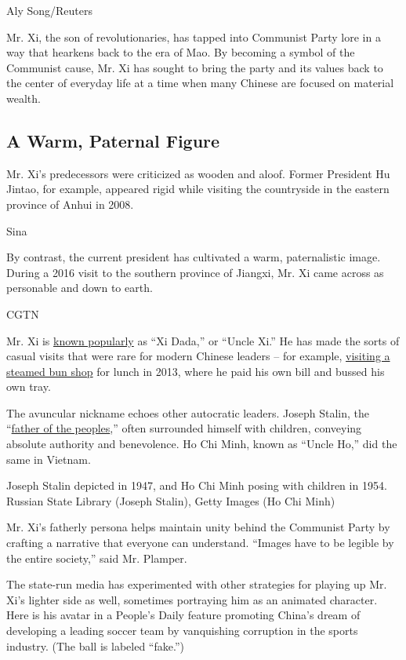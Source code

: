 Aly Song/Reuters

Mr. Xi, the son of revolutionaries, has tapped into Communist Party lore
in a way that hearkens back to the era of Mao. By becoming a symbol of
the Communist cause, Mr. Xi has sought to bring the party and its values
back to the center of everyday life at a time when many Chinese are
focused on material wealth.

\hypertarget{a-warm-paternal-figure}{%
\subsection{A Warm, Paternal Figure}\label{a-warm-paternal-figure}}

Mr. Xi's predecessors were criticized as wooden and aloof. Former
President Hu Jintao, for example, appeared rigid while visiting the
countryside in the eastern province of Anhui in 2008.

Sina

By contrast, the current president has cultivated a warm, paternalistic
image. During a 2016 visit to the southern province of Jiangxi, Mr. Xi
came across as personable and down to earth.

CGTN

Mr. Xi is
\href{https://www.nytimes.com/2015/03/08/world/move-over-mao-beloved-papa-xi-awes-china.html}{known
popularly} as ``Xi Dada,'' or ``Uncle Xi.'' He has made the sorts of
casual visits that were rare for modern Chinese leaders -- for example,
\href{https://sinosphere.blogs.nytimes.com/2013/12/30/divining-chinas-direction-by-what-xi-ate/}{visiting
a steamed bun shop} for lunch in 2013, where he paid his own bill and
bussed his own tray.

The avuncular nickname echoes other autocratic leaders. Joseph Stalin,
the
``\href{http://press-files.anu.edu.au/downloads/press/n2129/html/ch03.xhtml?referer=2129\&page=9}{father
of the peoples},'' often surrounded himself with children, conveying
absolute authority and benevolence. Ho Chi Minh, known as ``Uncle Ho,''
did the same in Vietnam.

Joseph Stalin depicted in 1947, and Ho Chi Minh posing with children in
1954. Russian State Library (Joseph Stalin), Getty Images (Ho Chi Minh)

Mr. Xi's fatherly persona helps maintain unity behind the Communist
Party by crafting a narrative that everyone can understand. ``Images
have to be legible by the entire society,'' said Mr. Plamper.

The state-run media has experimented with other strategies for playing
up Mr. Xi's lighter side as well, sometimes portraying him as an
animated character. Here is his avatar in a People's Daily feature
promoting China's dream of developing a leading soccer team by
vanquishing corruption in the sports industry. (The ball is labeled
``fake.'')

